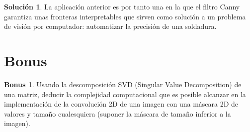 \documentclass[a4paper, 11pt]{article}
\theoremstyle{definition}
\newtheorem*{solucion}{Solución}
\theoremstyle{theorem}
\newtheorem{bonus}{Bonus}
\begin{document}
\begin{solucion}
      La aplicación anterior es por tanto una en la que el filtro Canny garantiza unas fronteras interpretables que sirven como solución a un problema de visión por computador: automatizar la precisión de una soldadura.
  \end{solucion}

  \newpage
  \section{Bonus}

  \begin{bonus}
      Usando la descomposición SVD (Singular Value Decomposition) de una matriz, deducir la complejidad computacional que es posible alcanzar en la implementación de la convolución 2D de una imagen con una máscara 2D de valores y tamaño cualesquiera (suponer la máscara de tamaño inferior a la imagen).
  \end{bonus}
\end{document}
